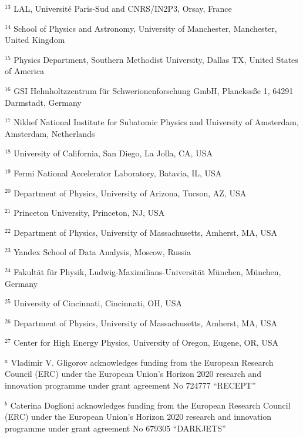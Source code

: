 \par {\footnotesize $^{13}$ LAL, Université Paris-Sud and CNRS/IN2P3, Orsay, France}
\par {\footnotesize $^{14}$ School of Physics and Astronomy, University of Manchester, Manchester, United Kingdom}
\par {\footnotesize $^{15}$ Physics Department, Southern Methodist University, Dallas TX, United States of America}
\par {\footnotesize $^{16}$ GSI Helmholtzzentrum f\"ür Schwerionenforschung GmbH, Planckssße 1, 64291 Darmstadt, Germany}
\par {\footnotesize $^{17}$ Nikhef National Institute for Subatomic Physics and University of Amsterdam, Amsterdam, Netherlands}
\par {\footnotesize $^{18}$ University of California, San Diego, La Jolla, CA, USA}
\par {\footnotesize $^{19}$ Fermi National Accelerator Laboratory, Batavia, IL, USA}
\par {\footnotesize $^{20}$ Department of Physics, University of Arizona, Tucson, AZ, USA}
\par {\footnotesize $^{21}$ Princeton University, Princeton, NJ, USA}
\par {\footnotesize $^{22}$ Department of Physics, University of Massachusetts, Amherst, MA, USA}
\par {\footnotesize $^{23}$ Yandex School of Data Analysis, Moscow, Russia}
\par {\footnotesize $^{24}$ Fakultät für Physik, Ludwig-Maximilians-Universität München, München, Germany}
\par {\footnotesize $^{25}$ University of Cincinnati, Cincinnati, OH, USA}
\par {\footnotesize $^{26}$ Department of Physics, University of Massachusetts, Amherst, MA, USA}
\par {\footnotesize $^{27}$ Center for High Energy Physics, University of Oregon, Eugene, OR, USA}
\bigskip
\par {\footnotesize $^{a}$ Vladimir V. Gligorov acknowledges funding from the European Research Council (ERC) under the European Union's Horizon 2020 research and innovation programme under grant agreement No 724777 “RECEPT”}
\par {\footnotesize $^{b}$ Caterina Doglioni acknowledges funding from the European Research Council (ERC) under the European Union's Horizon 2020 research and innovation programme under grant agreement No 679305 “DARKJETS”}
